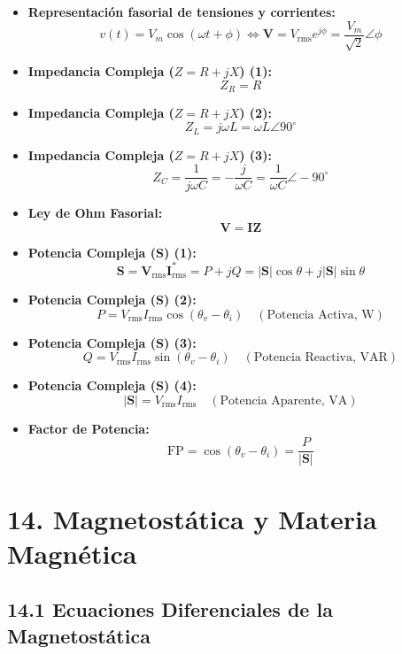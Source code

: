 \documentclass[11pt,a4paper]{article}
\begin{document}
\begin{itemize}
  \item \textbf{Representación fasorial de tensiones y corrientes:}
  \[
    v(t) = V_m \cos(\omega t + \phi) \iff \mathbf{V} = V_{\mathrm{rms}} e^{j\phi} = \frac{V_m}{\sqrt{2}} \angle \phi
  \]
  \item \textbf{Impedancia Compleja ($Z = R + jX$) (1):}
  \[
    Z_R = R
  \]
  \item \textbf{Impedancia Compleja ($Z = R + jX$) (2):}
  \[
    Z_L = j\omega L = \omega L \angle 90^\circ
  \]
  \item \textbf{Impedancia Compleja ($Z = R + jX$) (3):}
  \[
    Z_C = \frac{1}{j\omega C} = -\frac{j}{\omega C} = \frac{1}{\omega C} \angle -90^\circ
  \]
  \item \textbf{Ley de Ohm Fasorial:}
  \[
    \mathbf{V} = \mathbf{I} \mathbf{Z}
  \]
  \item \textbf{Potencia Compleja ($\mathbf{S}$) (1):}
  \[
    \mathbf{S} = \mathbf{V}_{\mathrm{rms}} \mathbf{I}_{\mathrm{rms}}^* = P + j Q = |\mathbf{S}| \cos\theta + j |\mathbf{S}| \sin\theta
  \]
  \item \textbf{Potencia Compleja ($\mathbf{S}$) (2):}
  \[
    P = V_{\mathrm{rms}} I_{\mathrm{rms}} \cos(\theta_v - \theta_i) \quad (\text{Potencia Activa, W})
  \]
  \item \textbf{Potencia Compleja ($\mathbf{S}$) (3):}
  \[
    Q = V_{\mathrm{rms}} I_{\mathrm{rms}} \sin(\theta_v - \theta_i) \quad (\text{Potencia Reactiva, VAR})
  \]
  \item \textbf{Potencia Compleja ($\mathbf{S}$) (4):}
  \[
    |\mathbf{S}| = V_{\mathrm{rms}} I_{\mathrm{rms}} \quad (\text{Potencia Aparente, VA})
  \]
  \item \textbf{Factor de Potencia:}
  \[
    \mathrm{FP} = \cos(\theta_v - \theta_i) = \frac{P}{|\mathbf{S}|}
  \]
\end{itemize}

\section*{14. Magnetostática y Materia Magnética}

\subsection*{14.1 Ecuaciones Diferenciales de la Magnetostática}
\end{document}

